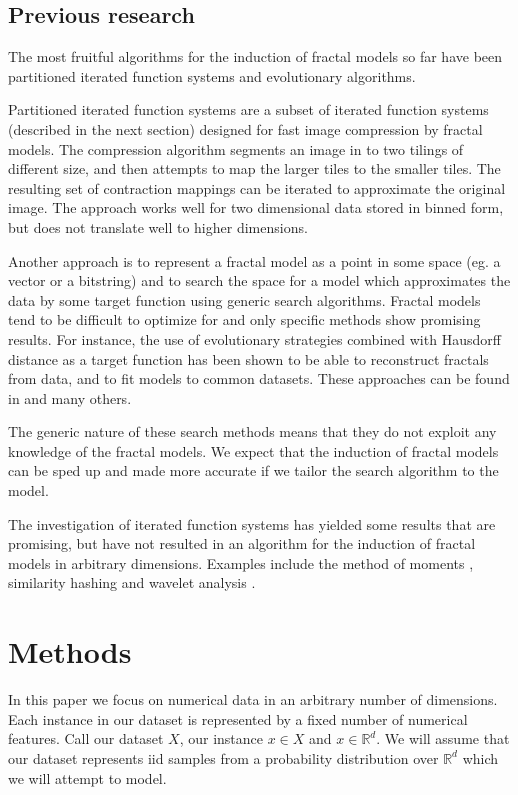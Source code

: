 \documentclass[10pt,a4paper,oneside]{article}
\theoremstyle{definition}
\begin{document}
\subsection*{Previous research}

The most fruitful algorithms for the induction of fractal models so far have been partitioned iterated function systems and evolutionary algorithms. 

Partitioned iterated function systems \cite{hart1996fractal} are a subset of iterated function systems (described in the next section) designed for fast image compression by fractal models. The compression algorithm segments an image in to two tilings of different size, and then attempts to map the larger tiles to the smaller tiles. The resulting set of contraction mappings can be iterated to approximate the original image. The approach works well for two dimensional data stored in binned form, but does not translate well to higher dimensions.

Another approach is to represent a fractal model as a point in some space (eg. a vector or a bitstring) and to search the space for a model which approximates the data by some target function using generic search algorithms. Fractal models tend to be difficult to optimize for and only specific methods show promising results. For instance, the use of evolutionary strategies combined with Hausdorff distance as a target function has been shown to be able to reconstruct fractals from data, and to fit models to common datasets. These approaches can be found in \cite{bloem2010fractal,nettleton1994evolutionary} and many others.

The generic nature of these search methods means that they do not exploit any knowledge of the fractal models. We expect that the induction of fractal models can be sped up and made more accurate if we tailor the search algorithm to the model.

The investigation of iterated function systems has yielded some results that are promising, but have not resulted in an algorithm for the induction of fractal models in arbitrary dimensions. Examples include the method of moments \cite{rinaldo1994inverse}, similarity hashing \cite{hart1997similarity} and wavelet analysis \cite{struzik1996coastline}.

\section*{Methods}

In this paper we focus on numerical data in an arbitrary number of dimensions. Each instance in our dataset is represented by a fixed number of numerical features. Call our dataset $X$, our instance $x \in X$ and $x \in {\mathbb R}^d$. We will assume that our dataset represents iid samples from a probability distribution over ${\mathbb R}^d$ which we will attempt to model.
\end{document}

